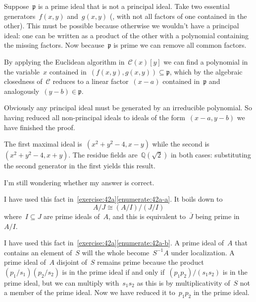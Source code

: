 \begin{exercise}
  \label{exercise:42d}
  Suppose~$\mathfrak{p}$ is a prime ideal that is not a principal ideal. Take two essential generators~$f(x,y)$ and~$g(x,y)$ (\ie, with not all factors of one contained in the other). This must be possible because otherwise we wouldn't have a principal ideal: one can be written as a product of the other with a polynomial containing the missing factors. Now because~$\mathfrak{p}$ is prime we can remove all common factors.

  By applying the Euclidean algorithm in~$\mathcal{C}(x)[y]$ we can find a polynomial in the variable~$x$ contained in~$(f(x,y),g(x,y))\subseteq\mathfrak{p}$, which by the algebraic closedness of~$\mathcal{C}$ reduces to a linear factor~$(x-a)$ contained in~$\mathfrak{p}$ and analogously~$(y-b)\in\mathfrak{p}$.

  Obviously any principal ideal must be generated by an irreducible polynomial. So having reduced all non-principal ideals to ideals of the form~$(x-a,y-b)$ we have finished the proof.
\end{exercise}

\begin{exercise}
  The first maximal ideal is~$(x^2+y^2-4,x-y)$ while the second is~$(x^2+y^2-4,x+y)$. The residue fields are~$\mathbb{Q}(\sqrt{2})$ in both cases: substituting the second generator in the first yields this result.
\end{exercise}

\begin{exercise} %
  I'm still wondering whether my answer is correct.
\end{exercise}

\begin{exercise}
  \label{exercise:42g}
  I have used this fact in~\autoref{exercise:42a}\ref{enumerate:42a-a}. It boils down to
  \begin{equation}
    A/J\cong (A/I)/(J/I) 
  \end{equation}
  where~$I\subseteq J$ are prime ideals of~$A$, and this is equivalent to~$\overline{J}$ being prime in~$A/I$.
\end{exercise}

\begin{exercise} %
  \label{exercise:42h}
  I have used this fact in~\autoref{exercise:42a}\ref{enumerate:42a-b}. A prime ideal of~$A$ that contains an element of~$S$ will the whole become~$S^{-1}A$ under localization. A prime ideal of~$A$ disjoint of~$S$ remains prime because the product~$(p_1/s_1)(p_2/s_2)$ is in the prime ideal if and only if~$(p_1p_2)/(s_1s_2)$ is in the prime ideal, but we can multiply with~$s_1s_2$ as this is by multiplicativity of~$S$ not a member of the prime ideal. Now we have reduced it to~$p_1p_2$ in the prime ideal.
\end{exercise}

